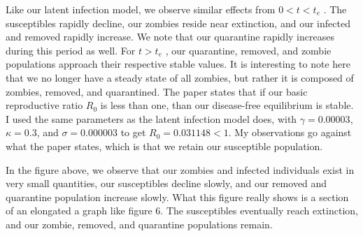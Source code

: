 \documentclass[]{article}
\begin{document}
Like our latent infection model, we observe similar effects from $0 < t < t_e$ . The
susceptibles rapidly decline, our zombies reside near extinction, and our infected and
removed rapidly increase. We note that our quarantine rapidly increases during this
period as well. For $t > t_e$ , our quarantine, removed, and zombie populations approach
their respective stable values. It is interesting to note here that we no longer have a
steady state of all zombies, but rather it is composed of zombies, removed, and
quarantined.
The paper states that if our basic reproductive ratio $R_0$ is less than one, than our
disease-free equilibrium is stable. I used the same parameters as the latent infection
model does, with $\gamma = 0.00003$, $\kappa = 0.3$, and $\sigma = 0.000003$ to get $R_0 = 0.031148 < 1$.
My observations go against what the paper states, which is that we retain our
susceptible population.

\begin{figure}[H]
\end{figure}

In the figure above, we observe that our zombies and infected individuals exist in very
small quantities, our susceptibles decline slowly, and our removed and quarantine
population increase slowly. What this figure really shows is a section of an elongated a
graph like figure 6. The susceptibles eventually reach extinction, and our zombie,
removed, and quarantine populations remain.
\end{document}
